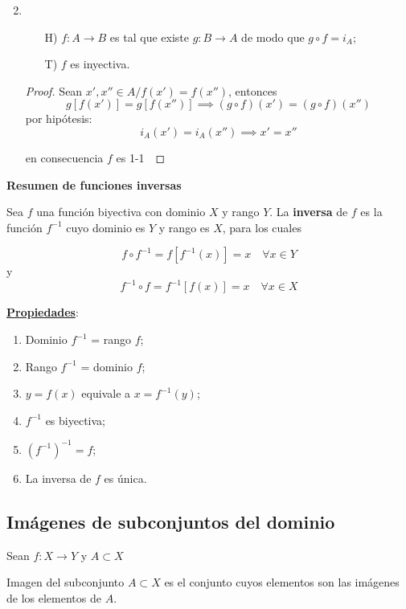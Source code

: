 \begin{fmd-example}
	\begin{enumerate}
		\setcounter{enumi}{1}
		\item \begin{itemize}
			\item[H)] $f: A \rightarrow B$ es tal que existe $g:B \rightarrow A$ de modo
			que $g \circ f = i_A$;
			\item[T)] $f$ es inyectiva.
		\end{itemize}\vspace{3mm}
		\begin{proof}
			Sean $x', x'' \in A / f(x') = f(x'')$, entonces
			\[ g[f(x')] = g[f(x'')] \implies (g \circ f)(x') = (g \circ f)(x'') \]
			por hipótesis: \[i_A(x') = i_A(x'') \implies x' = x''\]
			
			en consecuencia $f$ es 1-1\
		\end{proof}
	\end{enumerate}
\end{fmd-example}

\textbf{Resumen de funciones inversas}
\begin{fmd-definition}
	Sea $f$ una función biyectiva con dominio $X$ y rango $Y$. La \textbf{inversa}
	de $f$ es la función $f^{-1}$ cuyo dominio es $Y$ y rango es $X$, para los cuales
	
	\[ f \circ f^{-1} = f[f^{-1}(x)] = x \quad \forall x \in Y \]
	y \[ f^{-1} \circ f = f^{-1}[f(x)] = x  \quad \forall x \in X\]
\end{fmd-definition}

\underline{\textbf{Propiedades}}:

		\begin{enumerate}[label=\roman*)]
			\item Dominio $f^{-1}$ = rango $f$;
			\item Rango $f^{-1}$ = dominio $f$;
			\item $y = f(x)$ equivale a $x = f^{-1}(y)$;

			\setcounter{enumi}{3}
			\item $f^{-1}$ es biyectiva;
			\item $(f^{-1})^{-1} = f$;
			\item La inversa de $f$ es única.
		\end{enumerate}


\subsection{Imágenes de subconjuntos del dominio} \label{sec:imasub}
Sean $f : X \rightarrow Y$ y $A \subset X$ \index{imagen}
\begin{fmd-definition}
	Imagen del subconjunto $A \subset X$ es el conjunto cuyos elementos son las
	imágenes de los elementos de $A$.
\end{fmd-definition}


